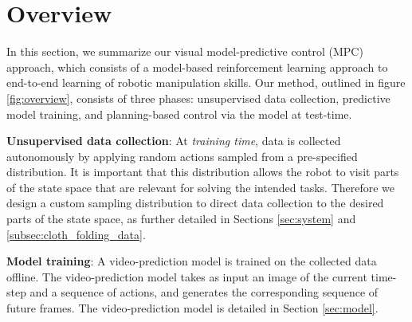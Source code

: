 \section{Overview}\label{sec:prelim}
\label{sec:vmpc}

In this section, we summarize our visual model-predictive control (MPC) approach, which consists of a model-based reinforcement learning approach to end-to-end learning of robotic manipulation skills. Our method, outlined in figure \ref{fig:overview}, consists of three phases: unsupervised data collection, predictive model training, and planning-based control via the model at test-time.

\textbf{Unsupervised data collection}: At \emph{training time}, data is collected autonomously by applying random actions sampled from a pre-specified distribution. It is important that this distribution allows the robot to visit parts of the state space that are relevant for solving the intended tasks. Therefore we design a custom sampling distribution to direct data collection to the desired parts of the state space, as further detailed in Sections \ref{sec:system} and \ref{subsec:cloth_folding_data}.

\textbf{Model training}: A video-prediction model is trained on the collected data offline. The video-prediction model takes as input an image of the current time-step and a sequence of actions, and generates the corresponding sequence of future frames. The video-prediction model is detailed in Section \ref{sec:model}.


